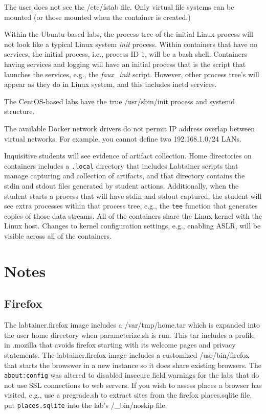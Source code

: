 \documentclass[12pt]{article}
\begin{document}
The user does not see the /etc/fstab file.  Only virtual file systems can be
mounted (or those mounted when the container is created.)

Within the Ubuntu-based labs, the process tree of the initial Linux process will
not look like a typical Linux system \textit{init} process.  Within containers that have no
services, the initial process, i.e., process ID 1, will be a bash shell.
Containers having services and logging will have an initial process that is
the script that launches the services, e.g., the \textit{faux\_init} script.  However,
other process tree's will appear as they
do in Linux system, and this includes inetd services.

The CentOS-based labs have the true /usr/sbin/init process and systemd structure.

The available Docker network drivers do not permit IP address overlap between virtual networks.
For example, you cannot define two 192.168.1.0/24 LANs.

Inquisitive students will see evidence of artifact collection.  Home directories
on containers includes a \texttt{.local} directory that includes Labtainer scripts that manage
capturing and collection of artifacts, and that directory contains the stdin and
stdout files generated by student actions. Additionally, when the student starts a process
that will have stdin and stdout captured, the student will see extra processes within
that process tree, e.g., the \texttt{tee} function that generates copies of those data streams.
All of the containers share the Linux kernel with the Linux host.  Changes to
kernel configuration settings, e.g., enabling ASLR, will be visible across all
of the containers.


\section{Notes} \label{Notes}
\label{Notes}
\subsection{Firefox}
The labtainer.firefox image includes a /var/tmp/home.tar 
which is expanded into the user home directory when parameterize.sh is run.
This tar includes a profile in .mozilla that avoids firefox starting with its 
welcome pages and privacy statements.  The labtainer.firefox image includes a 
customized /usr/bin/firefox that starts the browswer in a new instance so it does share existing browsers. 
The {\tt about:config}
was altered to disabled insecure field warnings for the labs that do not use SSL connections to web servers.
If you wish to assess places a browser has visited, e.g., use a pregrade.sh to extract sites from the
firefox places.sqlite file, put {\tt places.sqlite} into the lab's /\_bin/noskip file.
\end{document}
